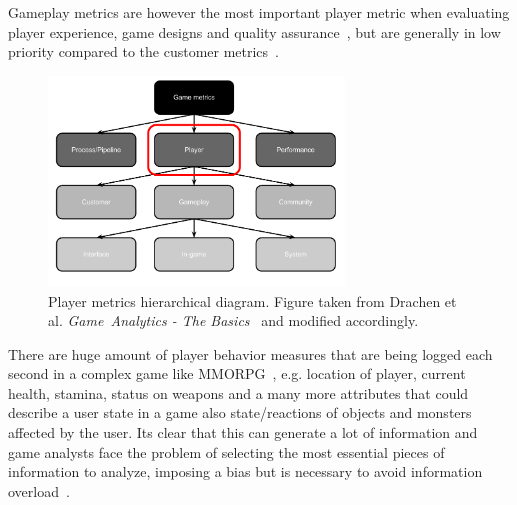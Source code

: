 Gameplay metrics are however the most important player metric when evaluating player experience, game designs and quality assurance~\citep{Kim:2008Tracking, Drachen:2012, Drachen:2011Evaluating}, but are generally in low priority compared to the customer metrics~\citep{Drachen:2013Basics}.
\begin{figure}[here]
\centerline{\includegraphics[width=0.7\textwidth]{Figures/Hierarchical_diagram_gamemetrics.pdf}}
\caption{Player metrics hierarchical diagram. Figure taken from Drachen et al. \textit{Game~Analytics - The Basics}~\citep{Drachen:2013Basics} and modified accordingly. }
\label{fig:gamemetrics}
\end{figure}
There are huge amount of player behavior measures that are being logged each second in a complex game like MMORPG~\citep{Kim:2008Tracking, Drachen:2011Evaluating}, e.g. location of player, current health, stamina, status on weapons and a many more attributes that could describe a user state in a game also state/reactions of objects and monsters affected by the user. Its clear that this can generate a lot of information and game analysts face the problem of selecting the most essential pieces of information to analyze, imposing a bias but is necessary to avoid information overload~\citep{Drachen:2013Basics}. 

